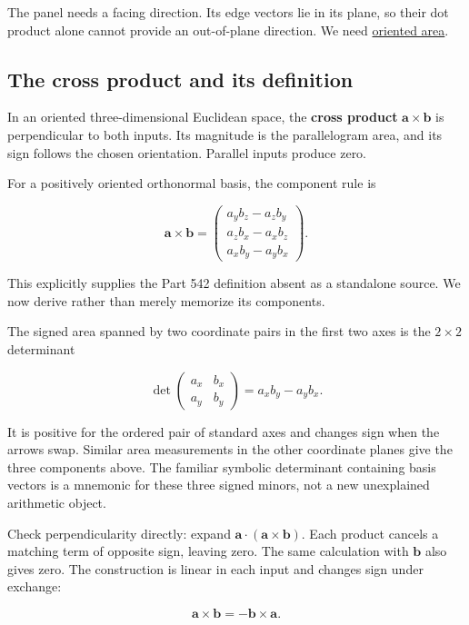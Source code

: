 The panel needs a facing direction. Its edge vectors lie in its plane, so their dot product alone cannot provide an out-of-plane direction. We need \hyperref[01-foundations-i-ch017-oriented-area-tells-us-which-side-of-the-panel-is-front]{oriented area}.

\subsection{The cross product and its definition}\label{01-foundations-i-ch017-the-cross-product-and-its-definition}

In an oriented three-dimensional Euclidean space, the \textbf{cross product} \(\mathbf a\times\mathbf b\) is perpendicular to both inputs. Its magnitude is the parallelogram area, and its sign follows the chosen orientation. Parallel inputs produce zero.

For a positively oriented orthonormal basis, the component rule is

\[
\mathbf a\times\mathbf b=
\begin{pmatrix}
a_yb_z-a_zb_y\\
a_zb_x-a_xb_z\\
a_xb_y-a_yb_x
\end{pmatrix}.
\]

This explicitly supplies the Part 542 definition absent as a standalone source. We now derive rather than merely memorize its components.

The signed area spanned by two coordinate pairs in the first two axes is the \(2\times2\) determinant

\[
\det\begin{pmatrix}a_x&b_x\\a_y&b_y\end{pmatrix}
=a_xb_y-a_yb_x.
\]

It is positive for the ordered pair of standard axes and changes sign when the arrows swap. Similar area measurements in the other coordinate planes give the three components above. The familiar symbolic determinant containing basis vectors is a mnemonic for these three signed minors, not a new unexplained arithmetic object.

Check perpendicularity directly: expand \(\mathbf a\cdot(\mathbf a\times\mathbf b)\). Each product cancels a matching term of opposite sign, leaving zero. The same calculation with \(\mathbf b\) also gives zero. The construction is linear in each input and changes sign under exchange:

\[
\mathbf a\times\mathbf b=-\mathbf b\times\mathbf a.
\]

